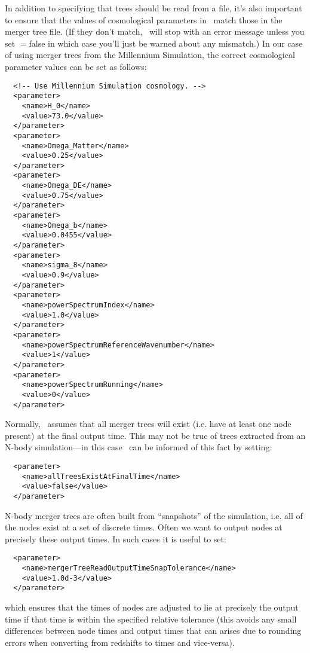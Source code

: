 In addition to specifying that trees should be read from a file, it's also important to ensure that the values of cosmological parameters in \glc\ match those in the merger tree file. (If they don't match, \glc\ will stop with an error message unless you set {\normalfont \ttfamily [mergerTreeReadMismatchIsFatal]}$=${\normalfont \ttfamily false} in which case you'll just be warned about any mismatch.) In our case of using merger trees from the Millennium Simulation, the correct cosmological parameter values can be set as follows:
\begin{verbatim}
  <!-- Use Millennium Simulation cosmology. -->
  <parameter>
    <name>H_0</name>
    <value>73.0</value>
  </parameter>
  <parameter>
    <name>Omega_Matter</name>
    <value>0.25</value>
  </parameter>
  <parameter>
    <name>Omega_DE</name>
    <value>0.75</value>
  </parameter>
  <parameter>
    <name>Omega_b</name>
    <value>0.0455</value>
  </parameter>
  <parameter>
    <name>sigma_8</name>
    <value>0.9</value>
  </parameter>
  <parameter>
    <name>powerSpectrumIndex</name>
    <value>1.0</value>
  </parameter>
  <parameter>
    <name>powerSpectrumReferenceWavenumber</name>
    <value>1</value>
  </parameter>
  <parameter>
    <name>powerSpectrumRunning</name>
    <value>0</value>
  </parameter>
\end{verbatim}

Normally, \glc\ assumes that all merger trees will exist (i.e. have at least one node present) at the final output time. This may not be true of trees extracted from an N-body simulation---in this case \glc\ can be informed of this fact by setting:
\begin{verbatim}
  <parameter>
    <name>allTreesExistAtFinalTime</name>
    <value>false</value>
  </parameter>
\end{verbatim}

N-body merger trees are often built from ``snapshots'' of the simulation, i.e. all of the nodes exist at a set of discrete times. Often we want to output nodes at precisely these output times. In such cases it is useful to set:
\begin{verbatim}
  <parameter>
    <name>mergerTreeReadOutputTimeSnapTolerance</name>
    <value>1.0d-3</value>
  </parameter>
\end{verbatim}
which ensures that the times of nodes are adjusted to lie at precisely the output time if that time is within the specified relative tolerance (this avoids any small differences between node times and output times that can arises due to rounding errors when converting from redshifts to times and vice-versa).

